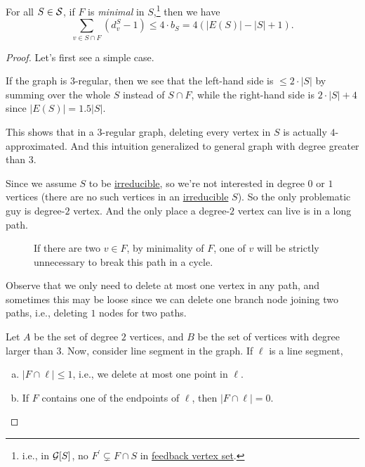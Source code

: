 \begin{lemma}\label{lma:lec4-2}
	For all \(S\in \mathcal{\MakeUppercase{S}} \), if \(F\) is \emph{minimal} in \(S\),\footnote{i.e., in \(\mathcal{\MakeUppercase{g}} [S]\), no \(F^\prime \subsetneq F \cap S\) in \hyperref[prb:feedback-vertex-set]{feedback vertex set}.} then we have
	\[
		\sum_{v\in S \cap F}(d_{v} ^S - 1) \leq 4\cdot b_S = 4(\left\vert E(S) \right\vert - \left\vert S \right\vert + 1).
	\]
\end{lemma}
\begin{proof}
	Let's first see a simple case.
	\begin{intuition}
		If the graph is \(3\)-regular, then we see that the left-hand side is \(\leq 2\cdot \left\vert S \right\vert \) by summing over the whole \(S\) instead of \(S\cap F\), while the right-hand side is \(2\cdot \left\vert S \right\vert + 4\) since \(\left\vert E(S) \right\vert = 1.5 \left\vert S \right\vert \).

		This shows that in a \(3\)-regular graph, deleting every vertex in \(S\) is actually \(4\)-approximated. And this intuition generalized to general graph with degree greater than \(3\).
	\end{intuition}

	Since we assume \(S\) to be \hyperref[def:irreducible]{irreducible}, so we're not interested in degree \(0\) or \(1\) vertices (there are no such vertices in an \hyperref[def:irreducible]{irreducible} \(S\)). So the only problematic guy is degree-\(2\) vertex. And the only place a degree-\(2\) vertex can live is in a long path.

	\begin{figure}[H]
		\centering
		\caption{If there are two \(v\in F\), by minimality of \(F\), one of \(v\) will be strictly unnecessary to break this path in a cycle.}
		\label{fig:FBV-path}
	\end{figure}
	\begin{note}
		Observe that we only need to delete at most one vertex in any path, and sometimes this may be loose since we can delete one branch node joining two paths, i.e., deleting \(1\) nodes for two paths.
	\end{note}

	Let \(A\) be the set of degree \(2\) vertices, and \(B\) be the set of vertices with degree larger than \(3\). Now, consider line segment in the graph. If \(\ell \) is a line segment,
	\begin{enumerate}[(a)]
		\item \(\left\vert F \cap  \ell  \right\vert \leq 1\), i.e., we delete at most one point in \(\ell \).
		\item If \(F\) contains one of the endpoints of \(\ell \), then \(\left\vert F \cap \ell  \right\vert = 0\).
	\end{enumerate}


\end{proof}

